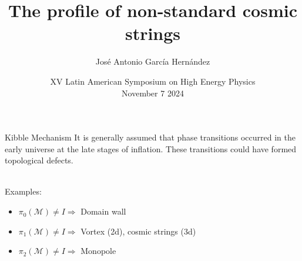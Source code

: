 \documentclass[14pt]{beamer}
\institute{Instituto de Ciencias Nucleares, UNAM}
\author{José Antonio García Hernández}
\title{The profile of non-standard cosmic strings}
\date{XV Latin American Symposium on High Energy Physics\\ November 7 2024}
\begin{document}
\begin{frame}
\titlepage
\end{frame}



\begin{frame}{Kibble Mechanism}
It is generally assumed that phase transitions occurred in the early universe at the late stages of inflation. These transitions could have formed topological defects. \\~\

Examples:\\
\begin{itemize}
	\item $\pi_0(\mathcal{M}) \neq I \Rightarrow$ Domain wall 
	\item $\pi_1(\mathcal{M}) \neq I\Rightarrow$ Vortex (2d), cosmic strings (3d) 
	\item $\pi_2(\mathcal{M}) \neq I\Rightarrow$ Monopole

\end{itemize}

\end{frame}


\begin{frame}
\centering
\end{frame}
\end{document}
